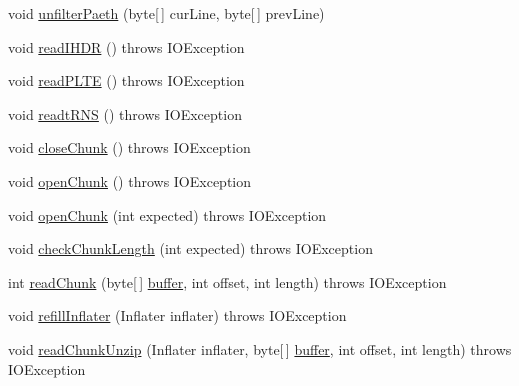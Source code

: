 \begin{DoxyCompactItemize}
\item 
void \mbox{\hyperlink{classorg_1_1newdawn_1_1slick_1_1opengl_1_1_p_n_g_decoder_a19d3f37f70d1993a379d3573a5517b66}{unfilter\+Paeth}} (byte\mbox{[}$\,$\mbox{]} cur\+Line, byte\mbox{[}$\,$\mbox{]} prev\+Line)
\item 
void \mbox{\hyperlink{classorg_1_1newdawn_1_1slick_1_1opengl_1_1_p_n_g_decoder_a9e7ed3f5ce8aaf724e3da6bdd9db1bd1}{read\+I\+H\+DR}} ()  throws I\+O\+Exception 
\item 
void \mbox{\hyperlink{classorg_1_1newdawn_1_1slick_1_1opengl_1_1_p_n_g_decoder_ab43622729c487fd442e6cbd9fcd7e1ed}{read\+P\+L\+TE}} ()  throws I\+O\+Exception 
\item 
void \mbox{\hyperlink{classorg_1_1newdawn_1_1slick_1_1opengl_1_1_p_n_g_decoder_a4f69d28cdeb7cbd83b4b6dfef7662e48}{readt\+R\+NS}} ()  throws I\+O\+Exception 
\item 
void \mbox{\hyperlink{classorg_1_1newdawn_1_1slick_1_1opengl_1_1_p_n_g_decoder_a8be80afb9e66943952de1e7d429303ac}{close\+Chunk}} ()  throws I\+O\+Exception 
\item 
void \mbox{\hyperlink{classorg_1_1newdawn_1_1slick_1_1opengl_1_1_p_n_g_decoder_afa7ad43df0de182a0fd27c9f6ca52e3d}{open\+Chunk}} ()  throws I\+O\+Exception 
\item 
void \mbox{\hyperlink{classorg_1_1newdawn_1_1slick_1_1opengl_1_1_p_n_g_decoder_ada9398fa248ff898e0c5195419026495}{open\+Chunk}} (int expected)  throws I\+O\+Exception 
\item 
void \mbox{\hyperlink{classorg_1_1newdawn_1_1slick_1_1opengl_1_1_p_n_g_decoder_aef71cafb11cec0a888ba705be7211e48}{check\+Chunk\+Length}} (int expected)  throws I\+O\+Exception 
\item 
int \mbox{\hyperlink{classorg_1_1newdawn_1_1slick_1_1opengl_1_1_p_n_g_decoder_ae2014f14734121c02f976b1fe4733c2d}{read\+Chunk}} (byte\mbox{[}$\,$\mbox{]} \mbox{\hyperlink{classorg_1_1newdawn_1_1slick_1_1opengl_1_1_p_n_g_decoder_ae205f9222586a2bc01a8a240c5c210ad}{buffer}}, int offset, int length)  throws I\+O\+Exception 
\item 
void \mbox{\hyperlink{classorg_1_1newdawn_1_1slick_1_1opengl_1_1_p_n_g_decoder_a041df9ceb129f2b773de08dff8899a28}{refill\+Inflater}} (Inflater inflater)  throws I\+O\+Exception 
\item 
void \mbox{\hyperlink{classorg_1_1newdawn_1_1slick_1_1opengl_1_1_p_n_g_decoder_a1c0d026f9bcd6134e9847846c8eb393e}{read\+Chunk\+Unzip}} (Inflater inflater, byte\mbox{[}$\,$\mbox{]} \mbox{\hyperlink{classorg_1_1newdawn_1_1slick_1_1opengl_1_1_p_n_g_decoder_ae205f9222586a2bc01a8a240c5c210ad}{buffer}}, int offset, int length)  throws I\+O\+Exception 

\end{DoxyCompactItemize}
